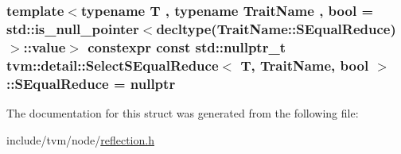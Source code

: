 \subsubsection[{\texorpdfstring{S\+Equal\+Reduce}{SEqualReduce}}]{\setlength{\rightskip}{0pt plus 5cm}template$<$typename T , typename Trait\+Name , bool  = std\+::is\+\_\+null\+\_\+pointer$<$decltype(\+Trait\+Name\+::\+S\+Equal\+Reduce)$>$\+::value$>$ constexpr const std\+::nullptr\+\_\+t {\bf tvm\+::detail\+::\+Select\+S\+Equal\+Reduce}$<$ T, Trait\+Name, bool $>$\+::S\+Equal\+Reduce = nullptr\hspace{0.3cm}{\ttfamily [static]}}\hypertarget{structtvm_1_1detail_1_1SelectSEqualReduce_a6de180df5c5b0cec0e62f75e576259cb}{}\label{structtvm_1_1detail_1_1SelectSEqualReduce_a6de180df5c5b0cec0e62f75e576259cb}


The documentation for this struct was generated from the following file\+:\begin{DoxyCompactItemize}
\item 
include/tvm/node/\hyperlink{reflection_8h}{reflection.\+h}\end{DoxyCompactItemize}
